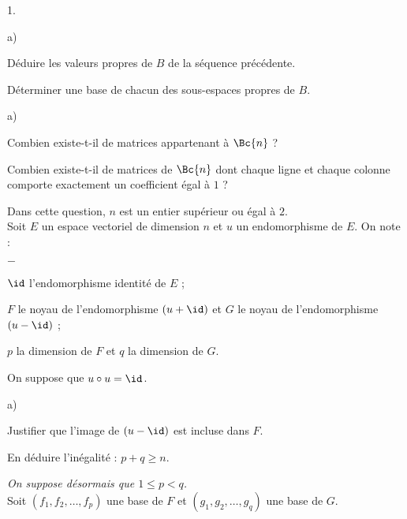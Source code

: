 \documentclass[11pt]{article}%
\begin{document}
\begin{noliste}{1.}
  \begin{noliste}{a)}
    \setlength{\itemsep}{2mm}
  \item Déduire les valeurs propres de $B$ de la séquence \Scilab{}
    précédente.
    
    
   	
  \item Déterminer une base de chacun des sous-espaces propres de $B$.
   	
    
    \end{noliste}




\item 
  \begin{noliste}{a)}
    \setlength{\itemsep}{2mm}
  \item Combien existe-t-il de matrices appartenant à $\Bc{n}$ ?
	
    
    
  \item Combien existe-t-il de matrices de $\Bc{n}$ dont chaque ligne
    et chaque colonne comporte exactement un coefficient égal à $1$
    ?
	
    
  \end{noliste}



  
\item Dans cette question, $n$ est un entier supérieur ou égal à $2$.\\
  Soit $E$ un espace vectoriel de dimension $n$ et $u$ un
  endomorphisme de $E$. On note :
  \begin{noliste}{$-$}
  \item $\id$ l'endomorphisme identité de $E$ ;
  \item $F$ le noyau de l'endomorphisme $(u+\id)$ et $G$ le noyau de
    l'endomorphisme $(u-\id)$ ;
  \item $p$ la dimension de $F$ et $q$ la dimension de $G$.
  \end{noliste}
  On suppose que $u \circ u =\id$.
  \begin{noliste}{a)}
    \setlength{\itemsep}{2mm}
  \item Justifier que l'image de $(u-\id)$ est incluse dans $F$.
	
    
    
  \item En déduire l'inégalité : $p + q \geq n$.
    
    
    {\it On suppose désormais que $1\leq p<q$.}\\
    Soit $(f_1, f_2, \ldots, f_p)$ une base de $F$ et $(g_1, g_2,
    \ldots, g_q)$ une base de $G$.


\end{noliste}
\end{noliste}
\end{document}
